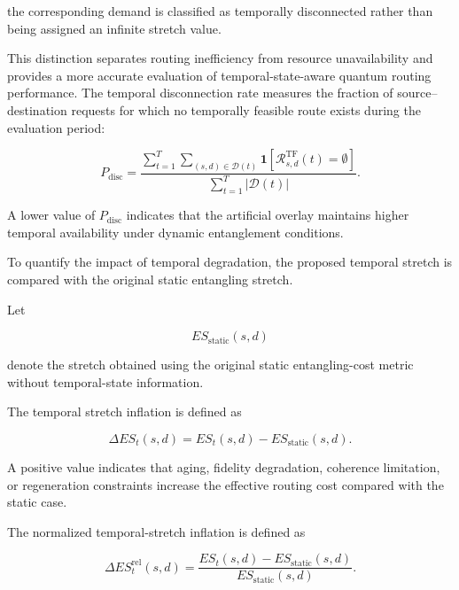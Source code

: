 the corresponding demand is classified as temporally disconnected rather than being assigned an infinite stretch value.

This distinction separates routing inefficiency from resource unavailability and provides a more accurate evaluation of temporal-state-aware quantum routing performance.
The temporal disconnection rate measures the fraction of source--destination requests for which no temporally feasible route exists during the evaluation period:

\begin{equation}
    P_{\mathrm{disc}}
    =
    \frac{
    \sum_{t=1}^{T}
    \sum_{(s,d)\in\mathcal{D}(t)}
    \mathbf{1}
    \left[
    \mathcal{R}_{s,d}^{\mathrm{TF}}(t)
    =
    \emptyset
    \right]
    }
    {
    \sum_{t=1}^{T}
    |\mathcal{D}(t)|
    }.
\end{equation}

A lower value of $P_{\mathrm{disc}}$ indicates that the artificial overlay maintains higher temporal availability under dynamic entanglement conditions.

To quantify the impact of temporal degradation, the proposed temporal stretch is compared with the original static entangling stretch.

Let

\begin{equation}
    ES_{\mathrm{static}}(s,d)
\end{equation}

denote the stretch obtained using the original static entangling-cost metric without temporal-state information.

The temporal stretch inflation is defined as

\begin{equation}
    \Delta ES_t(s,d)
    =
    ES_t(s,d)
    -
    ES_{\mathrm{static}}(s,d).
\end{equation}

A positive value indicates that aging, fidelity degradation, coherence limitation, or regeneration constraints increase the effective routing cost compared with the static case.

The normalized temporal-stretch inflation is defined as

\begin{equation}
    \Delta ES_t^{\mathrm{rel}}(s,d)
    =
    \frac{
    ES_t(s,d)
    -
    ES_{\mathrm{static}}(s,d)
    }
    {
    ES_{\mathrm{static}}(s,d)
    }.
\end{equation}

